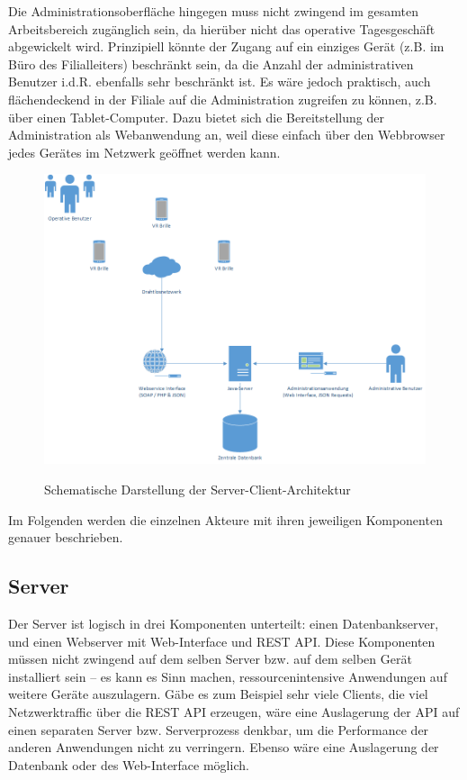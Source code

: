 Die Administrationsoberfläche hingegen muss nicht zwingend im gesamten Arbeitsbereich zugänglich sein, da hierüber nicht das operative Tagesgeschäft abgewickelt wird. Prinzipiell könnte der Zugang auf ein einziges Gerät (z.B. im Büro des Filialleiters) beschränkt sein, da die Anzahl der administrativen Benutzer i.d.R. ebenfalls sehr beschränkt ist. Es wäre jedoch praktisch, auch flächendeckend in der Filiale auf die Administration zugreifen zu können, z.B. über einen Tablet-Computer. Dazu bietet sich die Bereitstellung der Administration als Webanwendung an, weil diese einfach über den Webbrowser jedes Gerätes im Netzwerk geöffnet werden kann.

\begin{figure}[H]
	\centering
	{\includegraphics[width=\textwidth]{Bilder/Abbildungen/architektur_serverclient.png}}
	\caption{Schematische Darstellung der Server-Client-Architektur}
	\label{fig:architektur_serverclient}
\end{figure}

Im Folgenden werden die einzelnen Akteure mit ihren jeweiligen Komponenten genauer beschrieben.

\subsection{Server}

Der Server ist logisch in drei Komponenten unterteilt: einen Datenbankserver, und einen Webserver mit Web-Interface und \ac{REST} \ac{API}. Diese Komponenten müssen nicht zwingend auf dem selben Server bzw. auf dem selben Gerät installiert sein -- es kann es Sinn machen, ressourcenintensive Anwendungen auf weitere Geräte auszulagern. Gäbe es zum Beispiel sehr viele Clients, die viel Netzwerktraffic über die REST API erzeugen, wäre eine Auslagerung der API auf einen separaten Server bzw. Serverprozess denkbar, um die Performance der anderen Anwendungen nicht zu verringern. Ebenso wäre eine Auslagerung der Datenbank oder des Web-Interface möglich.


